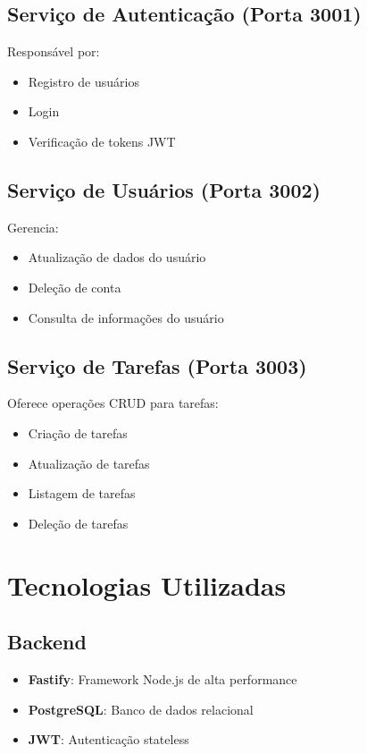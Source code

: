 \documentclass{article}
\begin{document}
\subsection{Serviço de Autenticação (Porta 3001)}
Responsável por:
\begin{itemize}
    \item Registro de usuários
    \item Login
    \item Verificação de tokens JWT
\end{itemize}

\subsection{Serviço de Usuários (Porta 3002)}
Gerencia:
\begin{itemize}
    \item Atualização de dados do usuário
    \item Deleção de conta
    \item Consulta de informações do usuário
\end{itemize}

\subsection{Serviço de Tarefas (Porta 3003)}
Oferece operações CRUD para tarefas:
\begin{itemize}
    \item Criação de tarefas
    \item Atualização de tarefas
    \item Listagem de tarefas
    \item Deleção de tarefas
\end{itemize}

\section{Tecnologias Utilizadas}
\subsection{Backend}
\begin{itemize}
    \item \textbf{Fastify}: Framework Node.js de alta performance
    \item \textbf{PostgreSQL}: Banco de dados relacional
    \item \textbf{JWT}: Autenticação stateless
\end{itemize}
\end{document}
